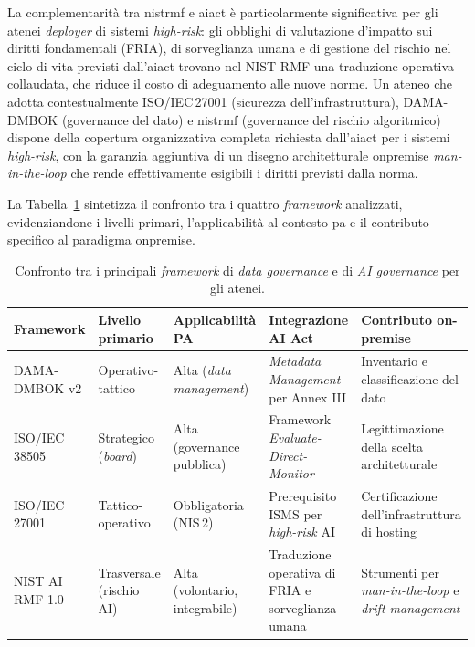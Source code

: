 La complementarità tra \gls{nistrmf} e \gls{aiact} è particolarmente significativa per gli atenei
\textit{deployer} di sistemi \textit{high-risk}: gli obblighi di valutazione d'impatto
sui diritti fondamentali (FRIA), di sorveglianza umana e di gestione del rischio nel
ciclo di vita previsti dall'\gls{aiact} trovano nel NIST RMF una traduzione operativa
collaudata, che riduce il costo di adeguamento alle nuove norme. Un ateneo che adotta
contestualmente ISO/IEC\,27001 (sicurezza dell'infrastruttura), DAMA-DMBOK
(governance del dato) e \gls{nistrmf} (governance del rischio algoritmico) dispone della
copertura organizzativa completa richiesta dall'\gls{aiact} per i sistemi \textit{high-risk},
con la garanzia aggiuntiva di un disegno architetturale \gls{onpremise}
\textit{man-in-the-loop} che rende effettivamente esigibili i diritti previsti dalla
norma.

La Tabella~\ref{tab:framework-governance} sintetizza il confronto tra i quattro \textit{framework} analizzati,
evidenziandone i livelli primari, l'applicabilità al contesto \gls{pa} e il contributo
specifico al paradigma \gls{onpremise}.

\begin{table}[H]
\centering
\caption{Confronto tra i principali \textit{framework} di \textit{data governance} e di
\textit{AI governance} per gli atenei.}
\label{tab:framework-governance}
\begin{tabularx}{\textwidth}{l X X X X}
\toprule
\textbf{Framework} & \textbf{Livello primario} & \textbf{Applicabilità PA} &
\textbf{Integrazione AI Act} & \textbf{Contributo on-premise} \\
\midrule
DAMA-DMBOK v2 & Operativo-tattico & Alta (\textit{data management}) & \textit{Metadata
Management} per Annex III & Inventario e classificazione del dato \\
ISO/IEC\,38505 & Strategico (\textit{board}) & Alta (governance pubblica) &
Framework \textit{Evaluate-Direct-Monitor} & Legittimazione della scelta architetturale \\
ISO/IEC\,27001 & Tattico-operativo & Obbligatoria (NIS\,2) & Prerequisito ISMS per
\textit{high-risk} AI & Certificazione dell'infrastruttura di hosting \\
NIST AI RMF 1.0 & Trasversale (rischio AI) & Alta (volontario, integrabile) & Traduzione
operativa di FRIA e sorveglianza umana & Strumenti per \textit{man-in-the-loop} e
\textit{drift management} \\
\bottomrule
\end{tabularx}
\end{table}

